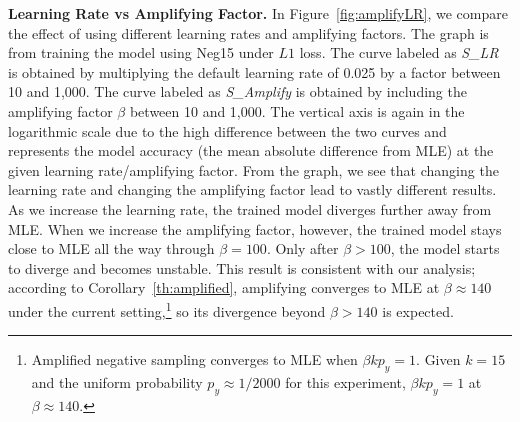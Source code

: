 \textbf{Learning Rate vs Amplifying Factor.} In Figure~\ref{fig:amplifyLR}, we compare the effect of using different learning rates and amplifying factors. The graph is from training the model using Neg15 under $L1$ loss. The curve labeled as \emph{S\_LR} is obtained by multiplying the default learning rate of 0.025 by a factor between 10 and 1,000. The curve labeled as \emph{S\_Amplify} is obtained by including the amplifying factor $\beta$ between 10 and 1,000. The vertical axis is again in the logarithmic scale due to the high difference between the two curves and represents the model accuracy (the mean absolute difference from MLE) at the given learning rate/amplifying factor. From the graph, we see that changing the learning rate and changing the amplifying factor lead to vastly different results. As we increase the learning rate, the trained model diverges further away from MLE. When we increase the amplifying factor, however, the trained model stays close to MLE all the way through $\beta = 100$. Only after $\beta > 100$, the model starts to diverge and becomes unstable. This result is consistent with our analysis; according to Corollary~\ref{th:amplified}, amplifying converges to MLE at $\beta \approx 140$ under the current setting,\footnote{Amplified negative sampling converges to MLE when $\beta k p_y = 1$. Given $k=15$ and the uniform probability $p_y \approx 1/2000$ for this experiment, $\beta k p_y = 1$ at $\beta \approx 140$.} so its divergence beyond $\beta > 140$ is expected.

